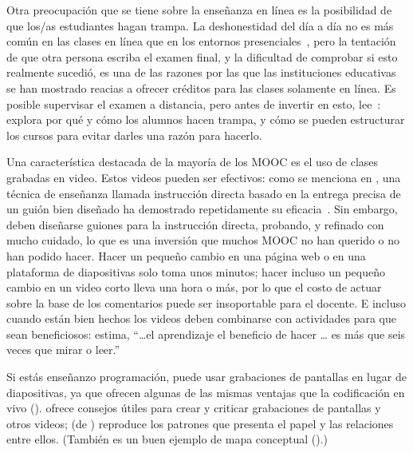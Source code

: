 Otra preocupación que se tiene sobre la enseñanza en línea es la posibilidad de que los/as estudiantes hagan trampa.
La deshonestidad del día a día no es más común en las clases en línea que en los entornos presenciales~\cite{Beck2014},
pero la tentación de que otra persona escriba el examen final,
y la dificultad de comprobar si esto realmente sucedió,
es una de las razones por las que las instituciones educativas se han mostrado reacias a ofrecer créditos para las clases solamente en línea.
Es posible supervisar el examen a distancia,
pero antes de invertir en esto,
lee~\cite{Lang2013}:
explora por qué y cómo los alumnos hacen trampa,
y cómo se pueden estructurar los cursos para evitar darles una razón para hacerlo.


Una característica destacada de la mayoría de los MOOC es el uso de clases grabadas en video.
Estos videos pueden ser efectivos:
como se menciona en ,
una técnica de enseñanza llamada instrucción directa
basado en la entrega precisa de un guión bien diseñado ha demostrado repetidamente su eficacia~\cite{Stoc2018}.
Sin embargo,
deben diseñarse guiones para la instrucción directa,
probando,
y refinado con mucho cuidado,
lo que es una inversión que muchos MOOC no han querido o no han podido hacer.
Hacer un pequeño cambio en una página web o en una plataforma de diapositivas solo toma unos minutos;
hacer incluso un pequeño cambio en un video corto lleva una hora o más,
por lo que el costo de actuar sobre la base de los comentarios puede ser insoportable para el docente.
E incluso cuando están bien hechos
los videos deben combinarse con actividades para que sean beneficiosos:
\cite{Koed2015} estima,
``{\ldots}el aprendizaje el beneficio de hacer {\ldots} es
más que seis veces que mirar o leer.''

Si estás enseñanzo programación,
puede usar grabaciones de pantallas en lugar de diapositivas,
ya que ofrecen algunas de las mismas ventajas que la codificación en vivo ().
\cite{Chen2009} ofrece consejos útiles para crear y criticar grabaciones de pantallas y otros videos;
 (de \cite{Chen2009}) reproduce los patrones que presenta el papel
y las relaciones entre ellos.
(También es un buen ejemplo de mapa conceptual ().)


